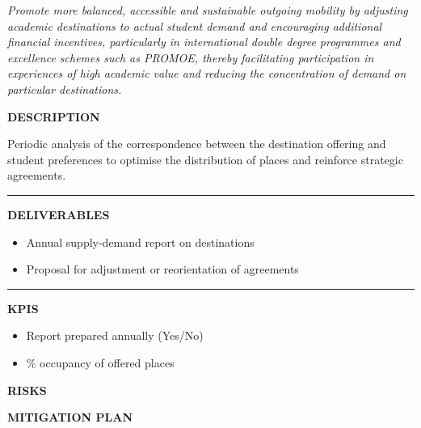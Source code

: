 \documentclass[11pt,a4paper]{scrreprt}
\newcommand{\fieldlabel}[1]{%
  {\footnotesize\sffamily\bfseries\color{mutedcolor}\MakeUppercase{#1}}\par\nopagebreak[4]
}
\newcommand{\fieldsep}{\vspace{3pt}\noindent\textcolor{bordercolor}{\rule{\linewidth}{0.4pt}}\vspace{3pt}\par}
\begin{document}
\newpage
{}
{\small\color{mutedcolor}\itshape Promote more balanced, accessible and sustainable outgoing mobility by adjusting academic destinations to actual student demand and encouraging additional financial incentives, particularly in international double degree programmes and excellence schemes such as PROMOE, thereby facilitating participation in experiences of high academic value and reducing the concentration of demand on particular destinations. }\par\vspace{6pt}

\begin{tcolorbox}[pabox={fgcolor}{A.P.4.1 \enspace\textbullet\enspace Adjust Supply and Demand between Destinations and Student Preferences}]

\fieldlabel{Description}
{\small Periodic analysis of the correspondence between the destination offering and student preferences to optimise the distribution of places and reinforce strategic agreements.}\par
\fieldsep
\fieldlabel{Deliverables}
{\small \begin{itemize}[noitemsep,topsep=2pt]
\item Annual supply-demand report on destinations
\item Proposal for adjustment or reorientation of agreements
\end{itemize}}\par
\fieldsep
\fieldlabel{KPIs}
{\small \begin{itemize}[noitemsep,topsep=2pt]
\item Report prepared annually (Yes/No)
\item \% occupancy of offered places
\end{itemize}}\par
\end{tcolorbox}
\begin{tcolorbox}[riskbox]
{\footnotesize\sffamily\bfseries\color{red!50!black} RISKS}\par{}
\end{tcolorbox}
\begin{tcolorbox}[mitbox]
{\footnotesize\sffamily\bfseries\color{green!40!black} MITIGATION PLAN}\par{}
\end{tcolorbox}
\vspace{8pt}
\end{document}
